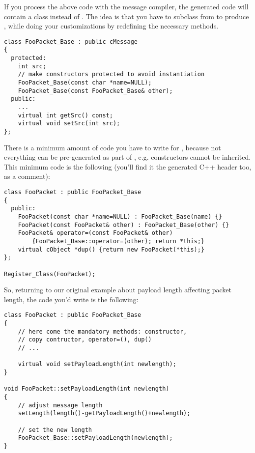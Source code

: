 If you process the above code with the message compiler,
the generated code will contain a  class
instead of . The idea is that you have
to subclass from  to produce
, while doing your customizations
by redefining the necessary methods.

\begin{verbatim}
class FooPacket_Base : public cMessage
{
  protected:
    int src;
    // make constructors protected to avoid instantiation
    FooPacket_Base(const char *name=NULL);
    FooPacket_Base(const FooPacket_Base& other);
  public:
    ...
    virtual int getSrc() const;
    virtual void setSrc(int src);
};
\end{verbatim}

There is a minimum amount of code you have to write
for , because not everything can be
pre-generated as part of , e.g.
constructors cannot be inherited. This minimum
code is the following (you'll find it the generated C++ header
too, as a comment):

\begin{verbatim}
class FooPacket : public FooPacket_Base
{
  public:
    FooPacket(const char *name=NULL) : FooPacket_Base(name) {}
    FooPacket(const FooPacket& other) : FooPacket_Base(other) {}
    FooPacket& operator=(const FooPacket& other)
        {FooPacket_Base::operator=(other); return *this;}
    virtual cObject *dup() {return new FooPacket(*this);}
};

Register_Class(FooPacket);
\end{verbatim}

So, returning to our original example about payload length
affecting packet length, the code you'd write is the following:

\begin{verbatim}
class FooPacket : public FooPacket_Base
{
    // here come the mandatory methods: constructor,
    // copy contructor, operator=(), dup()
    // ...

    virtual void setPayloadLength(int newlength);
}

void FooPacket::setPayloadLength(int newlength)
{
    // adjust message length
    setLength(length()-getPayloadLength()+newlength);

    // set the new length
    FooPacket_Base::setPayloadLength(newlength);
}
\end{verbatim}



